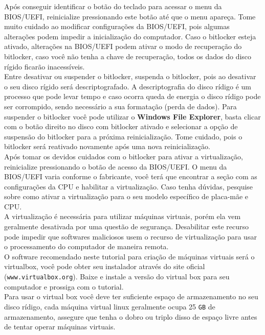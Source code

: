 \documentclass[12pt,a4paper]{article}
\begin{document}
\vspace{\baselineskip}

Após conseguir identificar o botão do teclado para acessar o menu da BIOS/UEFI, reinicialize pressionando este botão até que o menu apareça. Tome muito cuidado ao modificar configurações da BIOS/UEFI, pois algumas alterações podem impedir a inicialização do computador. Caso o bitlocker esteja ativado, alterações na BIOS/UEFI podem ativar o modo de recuperação do bitlocker, caso você não tenha a chave de recuperação, todos os dados do disco rígido ficarão inacessíveis.\\

Entre desativar ou suspender o bitlocker, suspenda o bitlocker, pois ao desativar o seu disco rígido será descriptografado. A descriptografia do disco rídigo é um processo que pode levar tempo e caso ocorra queda de energia o disco rídigo pode ser corrompido, sendo necessário a sua formatação (perda de dados). Para suspender o bitlocker você pode utilizar o \textbf{Windows File Explorer}, basta clicar com o botão direito no disco com bitlocker ativado e selecionar a opção de suspensão do bitlocker para a próxima reinicialização. Tome cuidado, pois o bitlocker será reativado novamente após uma nova reinicialização. \\

Após tomar os devidos cuidados com o bitlocker para ativar a virtualização, reinicialize pressionando o botão de acesso da BIOS/UEFI. O menu da BIOS/UEFI varia conforme o fabricante, você terá que encontrar a seção com as configurações da CPU e habilitar a virtualização. Caso tenha dúvidas, pesquise sobre como ativar a virtualização para o seu modelo específico de placa-mãe e CPU. \\

A virtualização é necessária para utilizar máquinas virtuais, porém ela vem geralmente desativada por uma questão de segurança. Desabilitar este recurso pode impedir que softwares maliciosos usem o recurso de virtualização para usar o processamento do computador de maneira remota. \\

O software recomendado neste tutorial para criação de máquinas virtuais será o virtualbox, você pode obter seu instalador através do site oficial (\texttt{www.virtualbox.org}). Baixe e instale a versão do virtual box para seu computador e prossiga com o tutorial. \\

Para usar o virtual box você deve ter suficiente espaço de armazenamento no seu disco rídigo, cada máquina virtual linux geralmente ocupa 25 \texttt{GB} de armazenamento, assegure que tenha o dobro ou triplo disso de espaço livre antes de tentar operar máquinas virtuais. \\
\end{document}
